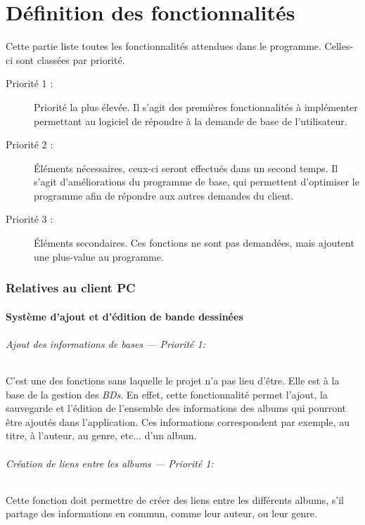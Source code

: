 \part{Définition des fonctionnalités}
Cette partie liste toutes les fonctionnalités attendues dans le programme. Celles-ci sont classées par priorité.

\begin{description}
\item [Priorité 1 :]
	Priorité la plus élevée. Il s'agit des premières fonctionnalités à implémenter permettant au logiciel de répondre à la demande de base de l'utilisateur.

\item [Priorité 2 :]
	Éléments nécessaires, ceux-ci seront effectués dans un second temps. Il s'agit d'améliorations du programme de base, qui permettent d'optimiser le programme afin de répondre aux autres demandes du client.  

\item [Priorité 3 :]
	Éléments secondaires. Ces fonctions ne sont pas demandées, mais ajoutent une plus-value au programme. 
\end{description}


\section{Relatives au client PC}

\subsection{Système d'ajout et d'édition de bande dessinées}
\paragraph{Ajout des informations de bases ---  \textit{Priorité 1}:}
C'est une des fonctions sans laquelle le projet n'a pas lieu d'être. Elle est à la base de la gestion des \emph{BDs}. En effet, cette fonctionnalité permet l'ajout, la sauvegarde et l'édition de l'ensemble des informations des albums qui pourront être ajoutés dans l'application. Ces informations correspondent par exemple, au titre, à l'auteur, au genre, etc... d'un album.

\paragraph{Création de liens entre les albums ---  \textit{Priorité 1}:}  
Cette fonction doit permettre de créer des liens entre les différents albums, s'il partage des informations en commun, comme leur auteur, ou leur genre.

